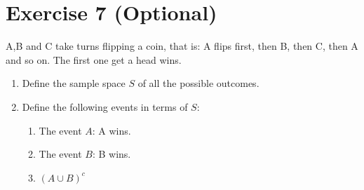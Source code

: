 \documentclass[12pt,thmsa]{article}
\begin{document}
\section*{Exercise 7 (Optional)}

A,B and C take turns flipping a coin, that is: A flips first, then B, then C, then A and so on. The first one get a head wins.
\begin{enumerate}
  \item Define the sample space $S$ of all the possible outcomes.
  \item Define the following events in terms of $S$:
\begin{enumerate}
  \item The event $A$: A wins.
  \item The event $B$: B wins.
  \item $(A \cup B)^c$
\end{enumerate}
\end{enumerate}

\end{document}
